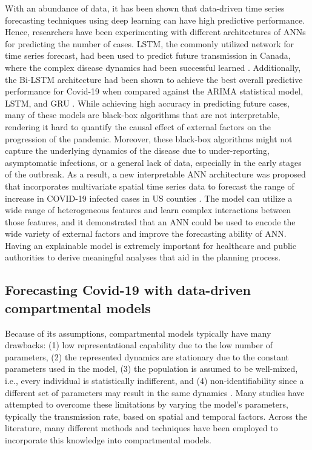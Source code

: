 With an abundance of data, it has been shown that data-driven time series forecasting techniques using deep learning can have high predictive performance.
Hence, researchers have been experimenting with different architectures of \glspl{ANN} for predicting the number of cases.
\gls{LSTM}, the commonly utilized network for time series forecast, had been used to predict future transmission in Canada, where the complex disease dynamics had been successful learned \cite{chimmulaTimeSeriesForecasting2020}.
Additionally, the \gls{Bi-LSTM} architecture had been shown to achieve the best overall predictive performance for Covid-19 when compared against the \gls{ARIMA} statistical model, \gls{LSTM}, and \gls{GRU} \cite{shahidPredictionsCOVID19Deep2020}.
While achieving high accuracy in predicting future cases, many of these models are black-box algorithms that are not interpretable, rendering it hard to quantify the causal effect of external factors on the progression of the pandemic.
Moreover, these black-box algorithms might not capture the underlying dynamics of the disease due to under-reporting, asymptomatic infections, or a general lack of data, especially in the early stages of the outbreak.
As a result, a new interpretable \gls{ANN} architecture was proposed that incorporates multivariate spatial time series data to forecast the range of increase in COVID-19 infected cases in \gls{US} counties \cite{ramchandaniDeepCOVIDNetInterpretableDeep2020}.
The model can utilize a wide range of heterogeneous features and learn complex interactions between those features, and it demonstrated that an \gls{ANN} could be used to encode the wide variety of external factors and improve the forecasting ability of \gls{ANN}.
Having an explainable model is extremely important for healthcare and public authorities to derive meaningful analyses that aid in the planning process.

\subsection{Forecasting Covid-19 with data-driven compartmental models}

Because of its assumptions, compartmental models typically have many drawbacks: (1) low representational capability due to the low number of parameters, (2) the represented dynamics are stationary due to the constant parameters used in the model, (3) the population is assumed to be well-mixed, i.e., every individual is statistically indifferent, and (4) non-identifiability since a different set of parameters may result in the same dynamics \cite{roosaAssessingParameterIdentifiability2019}.
Many studies have attempted to overcome these limitations by varying the model's parameters, typically the transmission rate, based on spatial and temporal factors.
Across the literature, many different methods and techniques have been employed to incorporate this knowledge into compartmental models.

